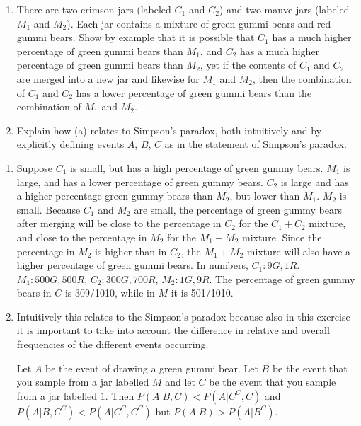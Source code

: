 

\setcounter{theorem}{22}
\begin{exercise}[BH.2.57]
    \begin{enumerate}
        \item There are two crimson jars (labeled $C_1$ and $C_2$) and two mauve jars (labeled $M_1$ and $M_2$). Each jar contains a mixture of green gummi bears and red gummi bears. Show by example that it is possible that $C_1$ has a much higher percentage of green gummi bears than $M_1$, and $C_2$ has a much higher percentage of green gummi bears than $M_2$, yet if the contents of $C_1$ and $C_2$ are merged into a new jar and likewise for $M_1$ and $M_2$, then the combination of $C_1$ and $C_2$ has a lower percentage of green gummi bears than the combination of $M_1$ and $M_2$.
        \item Explain how (a) relates to Simpson's paradox, both intuitively and by explicitly defining events $A$, $B$, $C$ as in the statement of Simpson’s paradox.
    \end{enumerate}
\begin{solution}
    \begin{enumerate}
        \item Suppose $C_{1}$ is small, but has a high percentage of green gummy bears. $M_{1}$ is large, and has a lower percentage of green gummy bears. $C_{2}$ is large and has a higher percentage green gummy bears than $M_{2}$, but lower than $M_{1}$. $M_{2}$ is small. Because $C_{1}$ and $M_{2}$ are small, the percentage of green gummy bears after merging will be close to the percentage in $C_{2}$ for the $C_{1}+C_{2}$ mixture, and close to the percentage in $M_{2}$ for the $M_{1}+M_{2}$ mixture. Since the percentage in $M_{2}$ is higher than in $C_{2}$, the $M_{1}+M_{2}$ mixture will also have a higher percentage of green gummi bears. In numbers, $C_{1}: 9G,1R$. $M_{1}: 500G,500R$, $C_{2}: 300G,700R$, $M_{2}:1G,9R$. The percentage of green gummy bears in $C$ is 309/1010, while in $M$ it is 501/1010.
        \item Intuitively this relates to the Simpson's paradox because also in this exercise it is important to take into account the difference in relative and overall frequencies of the different events occurring.

        Let $A$ be the event of drawing a green gummi bear. Let $B$ be the event that you sample from a jar labelled $M$ and let $C$ be the event that you sample from a jar labelled $1$. Then $P(A|B,C)<P(A|C^C,C)$ and $P(A|B,C^C)<P(A|C^C,C^C)$ but $P(A|B)>P(A|B^C)$.
    \end{enumerate}
\end{solution}
\end{exercise}

